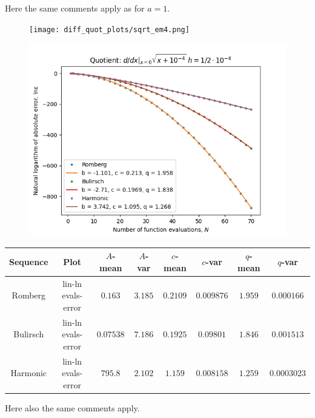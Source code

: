 Here the same comments apply as for \(a = 1\). 

\begin{figure}[H]
\centering
\begin{minipage}{0.45\textwidth}
\centering
\texttt{[image: diff\_quot\_plots/sqrt\_em4.png]}
\end{minipage}
\begin{minipage}{0.45\textwidth}
\centering
\includegraphics[scale=0.45]{diff_quot_plots/sqrt_em4_hp_trend.png}
\end{minipage}
\end{figure}

\begin{table}[H]
    \centering
    \small
    \begin{tabular}{c|c||c|c|c|c|c|c}
Sequence & Plot & \(A\)-mean & \(A\)-var & \(c\)-mean & \(c\)-var & \(q\)-mean & \(q\)-var\\\hline
Romberg & lin-ln evals-error & \(0.163\) & \(3.185\) & \(0.2109\) & \(0.009876\) & \(1.959\) & \(0.000166\) \\
Bulirsch & lin-ln evals-error & \(0.07538\) & \(7.186\) & \(0.1925\) & \(0.09801\) & \(1.846\) & \(0.001513\) \\
Harmonic & lin-ln evals-error & \(795.8\) & \(2.102\) & \(1.159\) & \(0.008158\) & \(1.259\) & \(0.0003023\) \\
    \end{tabular}
    \label{tab:my_label}
\end{table}

Here also the same comments apply.

